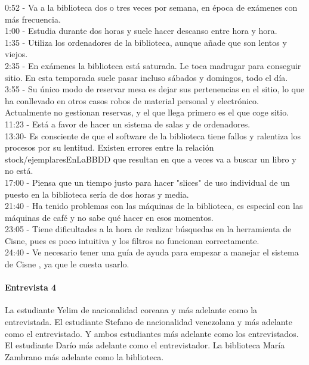 \documentclass[12pt]{article}
\begin{document}
0:52 -  Va a la biblioteca dos o tres veces por semana, en época de exámenes con más frecuencia.\\
1:00 -   Estudia durante dos horas y suele hacer descanso entre hora y hora.\\
1:35 - Utiliza los ordenadores de la biblioteca, aunque añade que son lentos y viejos.\\
2:35 - En exámenes la biblioteca está saturada. Le toca madrugar para conseguir sitio. En esta temporada suele pasar incluso sábados y domingos, todo el día.\\
3:55 - Su único modo de reservar mesa es dejar sus pertenencias en el sitio, lo que ha conllevado en otros casos robos de material personal y electrónico. Actualmente no gestionan reservas, y el que llega primero es el que coge sitio.\\
11:23 - Está a favor de hacer un sistema de salas y de ordenadores.\\
13:30- Es consciente de que el software de la biblioteca tiene fallos y ralentiza los procesos por su lentitud. Existen errores entre la relación stock/ejemplaresEnLaBBDD que resultan en que a veces va a buscar un libro y no está.\\
17:00 - Piensa que un tiempo justo para hacer "slices" de uso individual de un puesto en la biblioteca sería de dos horas y media.\\
21:40 -  Ha tenido problemas con las máquinas de la biblioteca, es especial con las máquinas de café y no sabe qué hacer en esos momentos.\\ 
23:05 - Tiene dificultades a la hora de realizar búsquedas en la herramienta de Cisne, pues es poco intuitiva y los filtros no funcionan correctamente.\\
24:40 - Ve necesario tener una guía de ayuda para empezar a manejar el sistema de Cisne , ya que le cuesta usarlo.\\

\paragraph{Entrevista 4}

La estudiante Yelim de nacionalidad coreana y más adelante como la entrevistada. El estudiante Stefano de nacionalidad venezolana y más adelante como el entrevistado. Y ambos estudiantes más adelante como los entrevistados. El estudiante Darío más adelante como el entrevistador. La biblioteca María Zambrano más adelante como la biblioteca. \\
\end{document}
